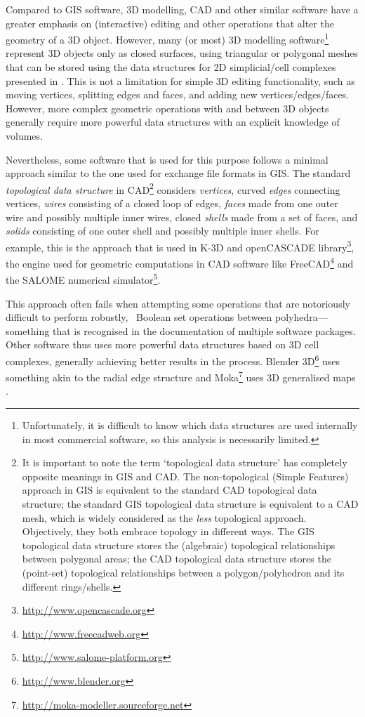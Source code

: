 Compared to GIS software, 3D modelling, CAD and other similar software have a greater emphasis on (interactive) editing and other operations that alter the geometry of a 3D object.
However, many (or most) 3D modelling software\footnote{Unfortunately, it is difficult to know which data structures are used internally in most commercial software, so this analysis is necessarily limited.} represent 3D objects only as closed surfaces, using triangular or polygonal meshes that can be stored using the data structures for 2D simplicial/cell complexes presented in .
This is not a limitation for simple 3D editing functionality, such as moving vertices, splitting edges and faces, and adding new vertices/edges/faces.
However, more complex geometric operations with and between 3D objects generally require more powerful data structures with an explicit knowledge of volumes.

Nevertheless, some software that is used for this purpose follows a minimal approach similar to the one used for exchange file formats in GIS.\@
The standard \emph{topological data structure} in CAD\footnote{It is important to note the term `topological data structure' has completely opposite meanings in GIS and CAD.\@
The non-topological (Simple Features) approach in GIS is equivalent to the standard CAD topological data structure; the standard GIS topological data structure is equivalent to a CAD mesh, which is widely considered as the \emph{less} topological approach.
Objectively, they both embrace topology in different ways.
The GIS topological data structure stores the (algebraic) topological relationships between polygonal areas; the CAD topological data structure stores the (point-set) topological relationships between a polygon/polyhedron and its different rings/shells.} considers \emph{vertices}, curved \emph{edges} connecting vertices, \emph{wires} consisting of a closed loop of edges, \emph{faces} made from one outer wire and possibly multiple inner wires, closed \emph{shells} made from a set of faces, and \emph{solids} consisting of one outer shell and possibly multiple inner shells.
For example, this is the approach that is used in K-3D \citep{Shead10} and openCASCADE library\footnote{\url{http://www.opencascade.org}}, the engine used for geometric computations in CAD software like FreeCAD\footnote{\url{http://www.freecadweb.org}} and the SALOME numerical simulator\footnote{\url{http://www.salome-platform.org}}.

This approach often fails when attempting some operations that are notoriously difficult to perform robustly, \eg\ Boolean set operations between polyhedra---something that is recognised in the documentation of multiple software packages.
Other software thus uses more powerful data structures based on 3D cell complexes, generally achieving better results in the process.
Blender 3D\footnote{\url{http://www.blender.org}} uses something akin to the radial edge structure \citep{Weiler88} and Moka\footnote{\url{http://moka-modeller.sourceforge.net}} uses 3D generalised maps \citep{Lienhardt94}.

